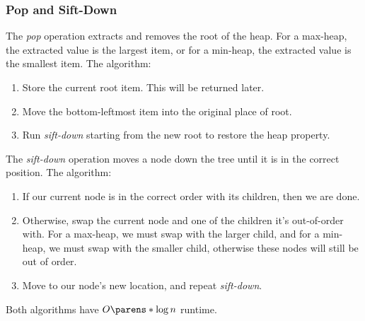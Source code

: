 \subsubsection{Pop and Sift-Down}

\begin{OpSectionSummary}
    \OpSigSep{}
\end{OpSectionSummary}

The \emph{pop} operation extracts and removes the root of the heap. For a max-heap, the extracted value is the largest item, or for a min-heap, the extracted value is the smallest item. The algorithm:
\begin{enumerate}
    \item Store the current root item. This will be returned later.
    \item Move the bottom-leftmost item into the original place of root.
    \item Run \emph{sift-down} starting from the new root to restore the heap property.
\end{enumerate}

The \emph{sift-down} operation moves a node down the tree until it is in the correct position. The algorithm:
\begin{enumerate}
    \item If our current node is in the correct order with its children, then we are done.
    \item Otherwise, swap the current node and one of the children it's out-of-order with. For a max-heap, we must swap with the larger child, and for a min-heap, we must swap with the smaller child, otherwise these nodes will still be out of order.
    \item Move to our node's new location, and repeat \emph{sift-down}.
\end{enumerate}

Both algorithms have $O \parens*{\log{n}}$ runtime.

